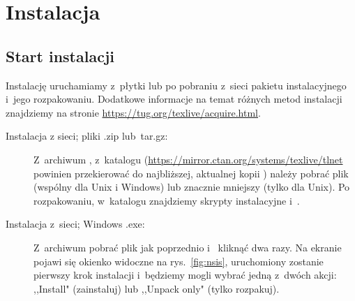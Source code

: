 \documentclass{article}
\begin{document}
\section{Instalacja}
\label{sec:install}

\subsection{Start instalacji}
\label{sec:inst-start}

Instalację \TL{} uruchamiamy z~płytki \TK{} \DVD{} lub po pobraniu z~sieci
pakietu instalacyjnego i~jego rozpakowaniu.
Dodatkowe informacje na temat różnych metod instalacji znajdziemy
na stronie \url{https://tug.org/texlive/acquire.html}.

\begin{description}
\item [Instalacja z sieci; pliki .zip lub~tar.gz:] Z~archiwum \CTAN, z~katalogu
(\url{https://mirror.ctan.org/systems/texlive/tlnet} powinien
przekierować do najbliższej, aktualnej kopii \CTAN) należy pobrać plik
 (wspólny dla Unix i Windows) lub znacznie mniejszy
 (tylko dla Unix). Po rozpakowaniu,
w~katalogu  znajdziemy skrypty instalacyjne
 i~.


\item [Instalacja z~sieci; Windows .exe:]
Z~archiwum \CTAN   pobrać plik jak poprzednio i~ kliknąć dwa razy. Na ekranie pojawi się okienko  widoczne na rys.~\ref{fig:nsis},  uruchomiony zostanie pierwszy krok instalacji  i~będziemy mogli wybrać jedną z~dwóch akcji: ,,Install" (zainstaluj) lub ,,Unpack only" (tylko rozpakuj).


\end{description}
\end{document}
